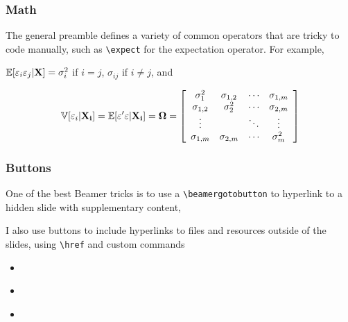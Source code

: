 \documentclass[aspectratio=169,handout]{beamer}
\begin{document}
\begin{frame}
	\frametitle{Math}
	\begin{witem}
	\item The general preamble defines a variety of common operators that are tricky to
		code manually, such as \texttt{\textbackslash{}expect} for the expectation operator. For example,

	\item
	 $\mathbb{E}[\varepsilon_i \varepsilon_j|\mathbf{X}] = \sigma_i^2$ if $i=j$, $\sigma_{ij}$ if $i \neq j$, and

		\begin{equation*}
		\mathbb{V}[\varepsilon_i|\mathbf{X_{i}}]
		=\mathbb{E}[\varepsilon^\prime \varepsilon | \mathbf{X_{i}}]
		= \boldsymbol{\Omega}
		= \left[
		\begin{array}{cccc}
			\sigma_1^2 		& \sigma_{1,2}	&	\cdots 	& \sigma_{1,m} 		\\
			\sigma_{1,2}		& \sigma_2^2 	&	\cdots 	& \sigma_{2,m} 		\\
			\vdots			&				&	\ddots	& \vdots				\\
			\sigma_{1,m}		& \sigma_{2,m}	&	\cdots 	& \sigma_m^2
		\end{array} \right]
		\end{equation*}
	\end{witem}
\end{frame}



\begin{frame}\label{fr:buttons}
	\frametitle{Buttons}
	\begin{witem}
		\item One of the best Beamer tricks is to use a 
			\texttt{\textbackslash{}beamergotobutton} to hyperlink to 
			a hidden slide with supplementary content, 
			\hyperlink{fr:hidden}{}
		\item I also use buttons to include hyperlinks to files and resources
			outside of the slides, using \texttt{\textbackslash{}href} and
			custom commands
			\begin{itemize}
				\item \href{https://drive.google.com/}{}
				\item \href{https://github.com/NicDuquette/Beamer-template/blob/main/README.md}{}
				\item \href{https://www.thebunnymuseum.com/}{}
			\end{itemize}

	\end{witem}
\end{frame}
\end{document}
